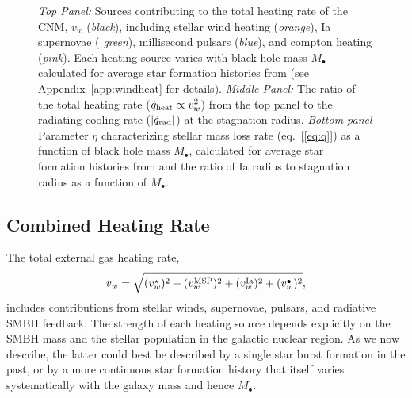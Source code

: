 \documentclass[usenatbib,fleqn]{mn2e}
\newcommand{\Mbh}[1][]{M_{\bullet#1}}
\newcommand{\vwO}{v_{w}}
\begin{document}
\begin{figure}
\caption{\label{fig:vwSources} {\it Top Panel:} Sources contributing
  to the total heating rate of the CNM, $\vwO$ ({\it black}),
  including stellar wind heating ({\it orange}), Ia supernovae ({\it
    green}), millisecond pulsars ({\it blue}), and compton heating
  ({\it pink}).  Each heating source varies with black hole mass
  $\Mbh$ calculated for average star formation histories from
  \citet{MosterNaab+:2013a} (see Appendix~\ref{app:windheat} for
  details).  {\it Middle Panel:} The ratio of the total heating rate
  ($\dot{q}_{\rm heat} \propto v_{w}^{2}$) from the top panel to the
  radiating cooling rate ($|\dot{q}_{\rm rad}|$) at the stagnation
  radius. {\it Bottom panel} Parameter $\eta$ characterizing stellar
  mass loss rate (eq.~[\ref{eq:q}]) as a function of black hole mass
  $\Mbh$, calculated for average star formation histories from and the
  ratio of Ia radius to stagnation radius as a function of $\Mbh$.}
\end{figure}





\subsection{Combined Heating Rate} 
\label{sec:combined}


The total external gas heating rate, 
\begin{equation}
\vwO = \sqrt{(v_{w}^{\star})^{2} + (v_{w}^{\rm MSP})^{2} + (v_{w}^{\rm Ia})^{2} + (v_{w}^{\bullet})^{2}},
\label{eq:vtot}
\end{equation}
includes contributions from stellar winds, supernovae, pulsars, and
radiative SMBH feedback.  The strength of each heating source depends
explicitly on the SMBH mass and the stellar population in the galactic
nuclear region.  As we now describe, the latter could best be
described by a single star burst formation in the past, or by a more
continuous star formation history that itself varies systematically
with the galaxy mass and hence $\Mbh$.
\end{document}

